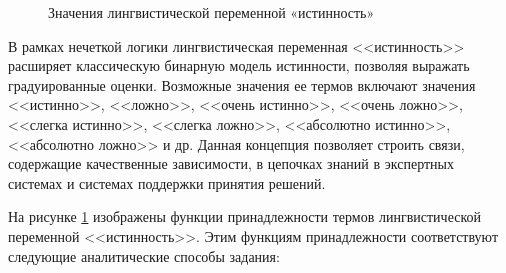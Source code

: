 \begin{figure}[ht]
	\caption{Значения лингвистической переменной «истинность»}
	\label{fig:ftv-all-cases}
\end{figure}

В рамках нечеткой логики лингвистическая переменная <<истинность>> расширяет классическую бинарную модель истинности, позволяя выражать градуированные оценки. Возможные значения ее термов включают значения <<истинно>>, <<ложно>>, <<очень истинно>>, <<очень ложно>>, <<слегка истинно>>, <<слегка ложно>>, <<абсолютно истинно>>, <<абсолютно ложно>> и др. Данная концепция позволяет строить связи, содержащие качественные зависимости, в цепочках знаний в экспертных системах и системах поддержки принятия решений.

На рисунке \cref{fig:ftv-all-cases} изображены функции принадлежности термов лингвистической переменной <<истинность>>. Этим функциям принадлежности соответствуют следующие аналитические способы задания:

